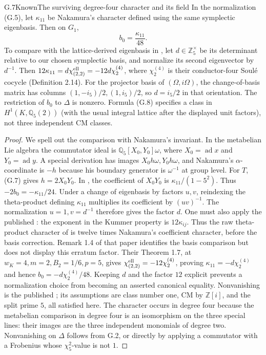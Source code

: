 \begin{statement}{G.7}{Known}{The surviving degree-four character and its field}
In the normalization (G.5), let $\kappa_{11}$ be Nakamura's character
defined using the same symplectic eigenbasis. Then on $G_1$,
\[
 b_0=\frac{\kappa_{11}}{48}.                             \tag{G.8}
\]
To compare with the lattice-derived eigenbasis in
\citet{IshiiGoto2026}, let $d\in\mathbb Z_5^\times$ be its
determinant relative to our chosen symplectic basis, and normalize
its second eigenvector by $d^{-1}$. Then
$12\kappa_{11}=d\chi^{\rm ell}_{(2,2)}=-12d\chi^{(4)}_2$,
where $\chi^{(4)}_2$ is their conductor-four Soul\'e cocycle
(Definition 2.14). For the projector basis of $(\Omega,i\Omega)$,
the change-of-basis matrix has columns
$(1,-i_5)/2,(1,i_5)/2$, so $d=i_5/2$ in that orientation.
The restriction of $b_0$ to $\Delta$
is nonzero. Formula (G.8) specifies a class in
$H^1(K,\mathbb Q_5(2))$ (with the usual integral lattice after the
displayed unit factors), not three independent CM classes.
\end{statement}
\begin{proof}
We spell out the comparison with Nakamura's invariant. In the
metabelian Lie algebra the commutator ideal is
$\mathbb Q_5[X_0,Y_0]\omega$, where $X_0=\operatorname{ad}x$ and
$Y_0=\operatorname{ad}y$. A special derivation has images
$X_0h\omega,Y_0h\omega$, and Nakamura's $\alpha$-coordinate is $-h$
because his boundary generator is $\omega^{-1}$ at group level.
For $T$, (G.7) gives $h=2X_0Y_0$. In
\citet[Theorem A, equivalently Corollary 4.12]{Nakamura1995}, the
coefficient of $X_0Y_0$ is
$\kappa_{11}/(1-5^2)$. Thus $-2b_0=-\kappa_{11}/24$.
Under a change of eigenbasis by factors $u,v$, reindexing the
theta-product defining $\kappa_{11}$ multiplies its coefficient
by $(uv)^{-1}$. The normalization $u=1,v=d^{-1}$ therefore
gives the factor $d$. One must also apply the published
\citet[p.~492, Errata to N95, correction of (3.11.4)]{Nakamura2013Eisenstein}:
the exponent in the Kummer property is $12\kappa_{ij}$.
Thus the raw theta-product character of \citet[Definition 1.3]{IshiiGoto2026}
is twelve times Nakamura's coefficient character, before the
basis correction. Remark 1.4 of that paper identifies the basis
comparison but does not display this erratum factor.
Their Theorem 1.7, at
$w_K=4,m=2,B_2=1/6,p=5$, gives
$\chi^{\rm ell}_{(2,2)}=-12\chi^{(4)}_2$, proving
$\kappa_{11}=-d\chi^{(4)}_2$ and hence
$b_0=-d\chi^{(4)}_2/48$. Keeping $d$ and the factor $12$
explicit prevents a normalization
choice from becoming an asserted canonical equality.
Nonvanishing is the published
\citet[Corollary 4.10]{Ishii2025}; its assumptions are class number one,
CM by $\mathbb Z[i]$, and the split prime $5$, all satisfied here.
The character occurs in degree four because the metabelian comparison
in degree four is an isomorphism on the three special lines: their
images are the three independent monomials of degree two. Nonvanishing
on $\Delta$ follows from G.2, or directly by applying a commutator with
a Frobenius whose $\chi_5^2$-value is not $1$.
\end{proof}

